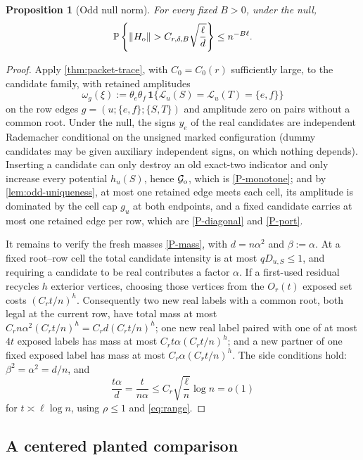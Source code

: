 \documentclass[11pt]{article}
\newtheorem{proposition}[proposition]{Proposition}
\theoremstyle{definition}
\theoremstyle{remark}
\newcommand{\bbP}{\mathbb P}
\newcommand{\1}{\mathbf 1}
\newcommand{\cG}{\mathcal G}
\newcommand{\cL}{\mathcal L}
\numberwithin{equation}{section}
\begin{document}
\begin{proposition}[Odd null norm]\label{prop:odd-null}
For every fixed $B>0$, under the null,
\begin{equation}\label{eq:odd-null}
 \bbP\left\{\|H_{\rm o}\|>
 C_{r,\delta,B}\sqrt{\frac\ell d}\right\}\le n^{-B\ell}.
\end{equation}
\end{proposition}
\begin{proof}
Apply \cref{thm:packet-trace}, with $C_0=C_0(r)$ sufficiently large, to
the candidate family, with retained amplitudes
\[
 \omega_g(\xi):=\theta_e\theta_f\,
 \1\{\cL_u(S)=\cL_u(T)=\{e,f\}\}
\]
on the row edges $g=(u;\{e,f\};\{S,T\})$ and amplitude zero on pairs
without a common root.  Under the null, the signs $y_e$ of the real
candidates are independent Rademacher conditional on the unsigned
marked configuration (dummy candidates may be given auxiliary
independent signs, on which nothing depends).  Inserting a candidate
can only destroy an old exact-two indicator and only increase every
potential $h_u(S)$, hence $\cG_{\rm o}$, which is \ref{P-monotone};
and by \cref{lem:odd-uniqueness}, at most one retained edge meets each
cell, its amplitude is dominated by the cell cap $g_u$ at both
endpoints, and a fixed candidate carries at most one retained edge per
row, which are \ref{P-diagonal} and \ref{P-port}.

It remains to verify the fresh masses \ref{P-mass}, with $d=n\alpha^2$
and $\beta:=\alpha$.  At a fixed root--row cell the total candidate
intensity is at most $qD_{u,S}\le1$, and requiring a candidate to be
real contributes a factor $\alpha$.  If a first-used residual recycles
$h$ exterior vertices, choosing those vertices from the $O_r(t)$
exposed set costs $(C_rt/n)^h$.  Consequently two new real labels with
a common root, both legal at the current row, have total mass at most
$C_rn\alpha^2(C_rt/n)^h=C_rd(C_rt/n)^h$; one new real label paired with
one of at most $4t$ exposed labels has mass at most
$C_rt\alpha(C_rt/n)^h$; and a new partner of one fixed exposed label
has mass at most $C_r\alpha(C_rt/n)^h$.  The side conditions hold:
$\beta^2=\alpha^2=d/n$, and
\begin{equation}\label{eq:odd-mixed-small}
 \frac{t\alpha}{d}=\frac{t}{n\alpha}
 \le C_r\sqrt{\frac\ell n}\log n=o(1)
\end{equation}
for $t\asymp\ell\log n$, using $\rho\le1$ and \cref{eq:range}.
\end{proof}

\subsection{A centered planted comparison}
\label{sec:odd-comparison}
\end{document}
